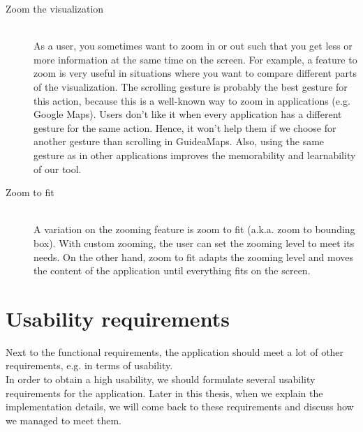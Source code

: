 \begin{description}
	\item[Zoom the visualization] \hfill \\
	As a user, you sometimes want to zoom in or out such that you get less or more information at the same time on the screen. For example, a feature to zoom is very useful in situations where you want to compare different parts of the visualization. The scrolling gesture is probably the best gesture for this action, because this is a well-known way to zoom in applications (e.g. Google Maps). Users don't like it when every application has a different gesture for the same action. Hence, it won't help them if we choose for another gesture than scrolling in GuideaMaps. Also, using the same gesture as in other applications improves the memorability and learnability of our tool.
	
	\item[Zoom to fit] \hfill \\
	A variation on the zooming feature is zoom to fit (a.k.a. zoom to bounding box). With custom zooming, the user can set the zooming level to meet its needs. On the other hand, zoom to fit adapts the zooming level and moves the content of the application until everything fits on the screen. 
  
\end{description}




\section{Usability requirements}\label{sec:usability-requirements}
Next to the functional requirements, the application should meet a lot of other requirements, e.g. in terms of usability.\\

In order to obtain a high usability, we should formulate several usability requirements for the application. Later in this thesis, when we explain the implementation details, we will come back to these requirements and discuss how we managed to meet them.

